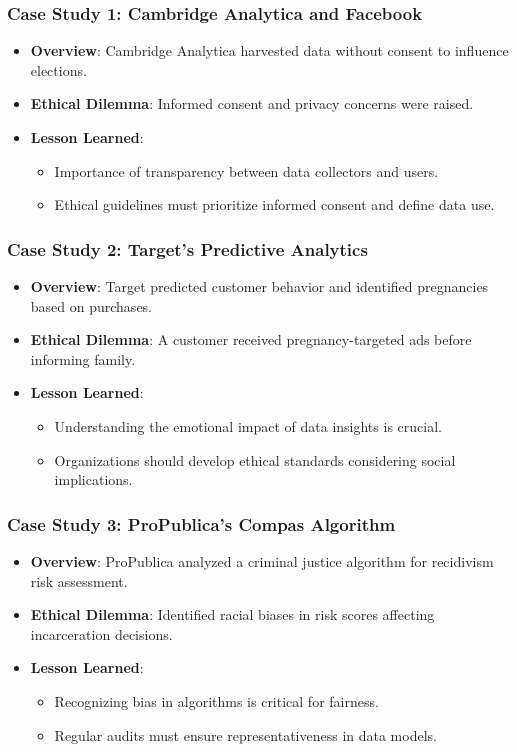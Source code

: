 \documentclass[aspectratio=169]{beamer}
\begin{document}
\begin{frame}[fragile]
    \frametitle{Case Study 1: Cambridge Analytica and Facebook}
    \begin{itemize}
        \item \textbf{Overview}: Cambridge Analytica harvested data without consent to influence elections.
        \item \textbf{Ethical Dilemma}: Informed consent and privacy concerns were raised.
        \item \textbf{Lesson Learned}:
        \begin{itemize}
            \item Importance of transparency between data collectors and users.
            \item Ethical guidelines must prioritize informed consent and define data use.
        \end{itemize}
    \end{itemize}
\end{frame}

\begin{frame}[fragile]
    \frametitle{Case Study 2: Target's Predictive Analytics}
    \begin{itemize}
        \item \textbf{Overview}: Target predicted customer behavior and identified pregnancies based on purchases.
        \item \textbf{Ethical Dilemma}: A customer received pregnancy-targeted ads before informing family.
        \item \textbf{Lesson Learned}:
        \begin{itemize}
            \item Understanding the emotional impact of data insights is crucial.
            \item Organizations should develop ethical standards considering social implications.
        \end{itemize}
    \end{itemize}
\end{frame}

\begin{frame}[fragile]
    \frametitle{Case Study 3: ProPublica's Compas Algorithm}
    \begin{itemize}
        \item \textbf{Overview}: ProPublica analyzed a criminal justice algorithm for recidivism risk assessment.
        \item \textbf{Ethical Dilemma}: Identified racial biases in risk scores affecting incarceration decisions.
        \item \textbf{Lesson Learned}:
        \begin{itemize}
            \item Recognizing bias in algorithms is critical for fairness.
            \item Regular audits must ensure representativeness in data models.
        \end{itemize}
    \end{itemize}
\end{frame}
\end{document}
